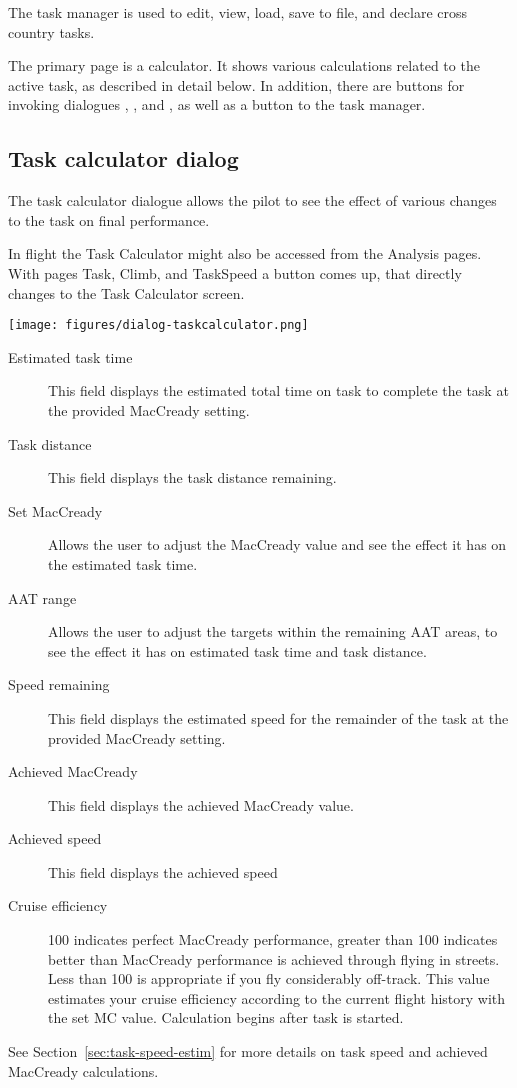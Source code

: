 The task manager is used to edit, view, load, save to file, and declare cross
country tasks.

The primary page is a calculator. It shows various calculations
related to the active task, as described in detail below.  In addition, there
are buttons for invoking dialogues , ,
and , as well as a button to  the task manager.

\subsection*{Task calculator dialog}\label{sec:task-calc-dial}
The task calculator dialogue allows the pilot to see the effect of
various changes to the task on final performance.

In flight the Task Calculator might also be accessed from the Analysis pages.
With pages Task, Climb, and TaskSpeed a button  comes up,
that directly changes to the Task Calculator screen.


\begin{center}
\texttt{[image: figures/dialog-taskcalculator.png]}
\end{center}

\begin{description}
\item[Estimated task time]  This field displays the estimated total time
  on task to complete the task at the provided MacCready setting.
\item[Task distance]  This field displays the task distance remaining.
\item[Set MacCready]  Allows the user to adjust the MacCready value and
  see the effect it has on the estimated task time.
\item[AAT range]  Allows the user to adjust the targets within the remaining
  AAT areas, to see the effect it has on estimated task time and task distance.
\item[Speed remaining]  This field displays the estimated speed for the
  remainder of the task at the provided MacCready setting.
\item[Achieved MacCready]  This field displays the achieved MacCready value.
\item[Achieved speed]  This field displays the achieved speed %
\item[Cruise efficiency]  100 indicates perfect MacCready performance, greater
than 100 indicates better than MacCready performance is achieved through flying
in streets. Less than 100 is appropriate if you fly considerably off-track. This
value estimates your cruise efficiency according to the current flight history
with the set MC value. Calculation begins after task is started.
\end{description}
See Section~\ref{sec:task-speed-estim} for more details on task speed
and achieved MacCready calculations.


